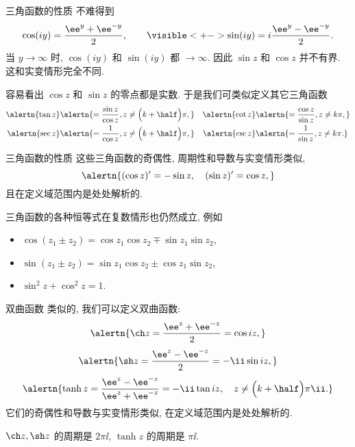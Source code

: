 \begin{frame}{三角函数的性质}
	\onslide<+->
	不难得到
	\[
		\cos(iy)=\dfrac{\ee^y+\ee^{-y}}2,\qquad
		\visible<+->{\sin(iy)=i\dfrac{\ee^y-\ee^{-y}}2.}
	
	\]
	\onslide<+->
	当 $y\to\infty$ 时, $\cos(iy)$ 和 $\sin(iy)$ 都 $\to\infty$.
	\onslide<+->
	因此 \alert{$\sin z$ 和 $\cos z$ 并不有界}. 
	\onslide<+->
	这和实变情形完全不同.

	\onslide<+->
	容易看出 $\cos z$ 和 $\sin z$ 的零点都是实数.
	\onslide<+->
	于是我们可类似定义其它三角函数
	\begin{align*}
		\alertn{\tan z}&
		\alertn{=\frac{\sin z}{\cos z},z\neq\Bigl(k+\half\Bigr)\pi,}&
		\alertn{\cot z}&
		\alertn{=\frac{\cos z}{\sin z},z\neq k\pi,}\\
		\alertn{\sec z}&
		\alertn{=\frac{1}{\cos z},z\neq\Bigl(k+\half\Bigr)\pi,}&
		\alertn{\csc z}&
		\alertn{=\frac{1}{\sin z},z\neq k\pi.}
	\end{align*}
\end{frame}


\begin{frame}{三角函数的性质}
	\onslide<+->
	这些三角函数的奇偶性, 周期性和导数与实变情形类似,
	\[\alertn{(\cos z)'=-\sin z,\quad
	(\sin z)'=\cos z,}
	\]
	\onslide<+->
	且在定义域范围内是处处解析的.

	\onslide<+->
	三角函数的各种恒等式在复数情形也仍然成立,
	\onslide<+->
	例如
	\begin{itemize}
		\item $\cos(z_1\pm z_2)=\cos z_1 \cos z_2\mp \sin z_1 \sin z_2$,
		\item $\sin(z_1\pm z_2)=\sin z_1 \cos z_2\pm\cos z_1 \sin z_2$,
		\item $\sin^2z+\cos^2z=1$.
	\end{itemize}
\end{frame}


\begin{frame}{双曲函数}
	\onslide<+->
	类似的, 我们可以定义双曲函数:
	\onslide<+->
	\[\alertn{\ch z=\frac{\ee^z+\ee^{-z}}2=\cos iz,}
	\]
	\onslide<+->
	\[\alertn{\sh z=\frac{\ee^z-\ee^{-z}}2=-\ii \sin iz,}
	\]
	\onslide<+->
	\[\alertn{\tanh z=\frac{\ee^z-\ee^{-z}}{\ee^z+\ee^{-z}}
	=-\ii \tan iz,\quad z\neq \Bigl(k+\half\Bigr)\pi\ii.}
	\]
	\onslide<+->
	它们的奇偶性和导数与实变情形类似, 在定义域范围内是处处解析的.

	\onslide<+->
	$\ch z,\sh z$ 的周期是 $2\pi\ii$, $\tanh z$ 的周期是 $\pi\ii$.
\end{frame}


